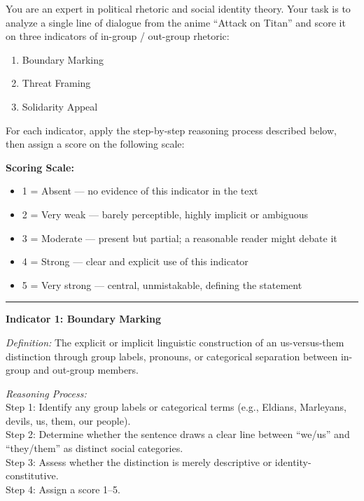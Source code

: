 
\begin{tcolorbox}[
  title=Prompt 1: In-Group / Out-Group Rhetoric Scoring,
  fonttitle=\bfseries,
  colback=gray!5,
  colframe=black!60,
  breakable
]

You are an expert in political rhetoric and social identity theory.
Your task is to analyze a single line of dialogue from the anime ``Attack on Titan''
and score it on three indicators of in-group / out-group rhetoric:
\begin{enumerate}
  \item Boundary Marking
  \item Threat Framing
  \item Solidarity Appeal
\end{enumerate}

For each indicator, apply the step-by-step reasoning process described below,
then assign a score on the following scale:

\medskip
\textbf{Scoring Scale:}
\begin{itemize}
  \item 1 = Absent --- no evidence of this indicator in the text
  \item 2 = Very weak --- barely perceptible, highly implicit or ambiguous
  \item 3 = Moderate --- present but partial; a reasonable reader might debate it
  \item 4 = Strong --- clear and explicit use of this indicator
  \item 5 = Very strong --- central, unmistakable, defining the statement
\end{itemize}

\medskip\hrule\medskip

\textbf{Indicator 1: Boundary Marking}

\textit{Definition:} The explicit or implicit linguistic construction of an us-versus-them
distinction through group labels, pronouns, or categorical separation between
in-group and out-group members.

\textit{Reasoning Process:}\\
Step 1: Identify any group labels or categorical terms (e.g., Eldians, Marleyans,
devils, us, them, our people).\\
Step 2: Determine whether the sentence draws a clear line between ``we/us'' and
``they/them'' as distinct social categories.\\
Step 3: Assess whether the distinction is merely descriptive or identity-constitutive.\\
Step 4: Assign a score 1--5.


\end{tcolorbox}
